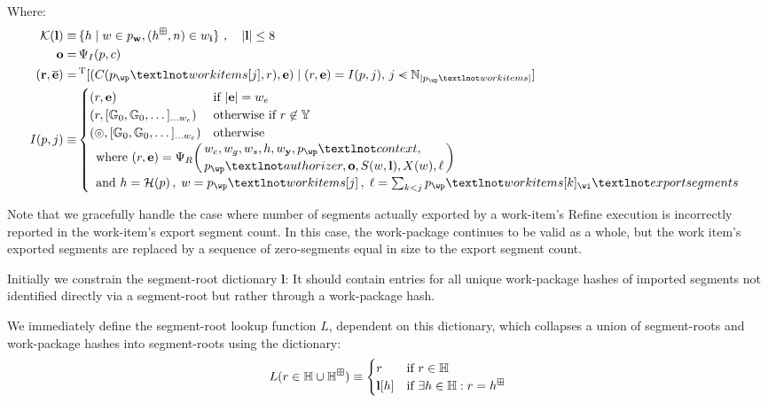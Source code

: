Where:
\begin{align*}
  \keys{\mathbf{l}} \equiv \,&\{ h \mid w \in p_\mathbf{w}, (h^\boxplus, n) \in w_\mathbf{i} \} \ ,\quad|\mathbf{l}| \le 8\\
  \mathbf{o} = \,&\Psi_I(\wpX, c) \\
  (\mathbf{r}, \overline{\mathbf{e}}) = \,&\transpose[
    (\itemtoresult(\wpX_\wp¬workitems[j], r), \mathbf{e})
    \mid
    (r, \mathbf{e}) = \countupexports(\wpX, j),\,
    j \orderedin \N_{|\wpX_\wp¬workitems|}
  ] \\
  \countupexports(\wpX, j) \equiv \,&\begin{cases}
    (r, \mathbf{e}) &\when |\mathbf{e}| = w_e \\
    (r, [\mathbb{G}_0, \mathbb{G}_0, \dots]_{\dots w_e}) &\otherwhen r \not\in \mathbb{Y} \\
    (\badexports, [\mathbb{G}_0, \mathbb{G}_0, \dots]_{\dots w_e}) &\otherwise \\
    \multicolumn{2}{l}{\where (r, \mathbf{e}) = \Psi_R\left(\,\begin{aligned}
      &\wiX_c, \wiX_g, \wiX_s, h, \wiX_\mathbf{y}, \wpX_\wp¬context,\\[2pt]
      &\wpX_\wp¬authorizer, \mathbf{o}, \importsegmentdata(w, \mathbf{l}), \extrinsicdata(w), \ell
    \end{aligned}\,\right)
    }\\
    \multicolumn{2}{l}{\also h = \mathcal{H}(\wpX)\,,\; w = \wpX_\wp¬workitems[j]\,,\; \ell = \sum_{k < j}\wpX_\wp¬workitems[k]_\wi¬exportsegments}
  \end{cases}
\end{align*}

Note that we gracefully handle the case where number of segments actually exported by a work-item's Refine execution is incorrectly reported in the work-item's export segment count. In this case, the work-package continues to be valid as a whole, but the work item's exported segments are replaced by a sequence of zero-segments equal in size to the export segment count.

Initially we constrain the segment-root dictionary $\mathbf{l}$: It should contain entries for all unique work-package hashes of imported segments not identified directly via a segment-root but rather through a work-package hash.

We immediately define the segment-root lookup function $L$, dependent on this dictionary, which collapses a union of segment-roots and work-package hashes into segment-roots using the dictionary:
\begin{equation}
  L(r \in \mathbb{H}\cup\mathbb{H}^\boxplus) \equiv \begin{cases}
    r &\text{if } r \in \mathbb{H} \\
    \mathbf{l}[h] &\text{if } \exists h \in \mathbb{H}: r = h^\boxplus
  \end{cases}
\end{equation}

